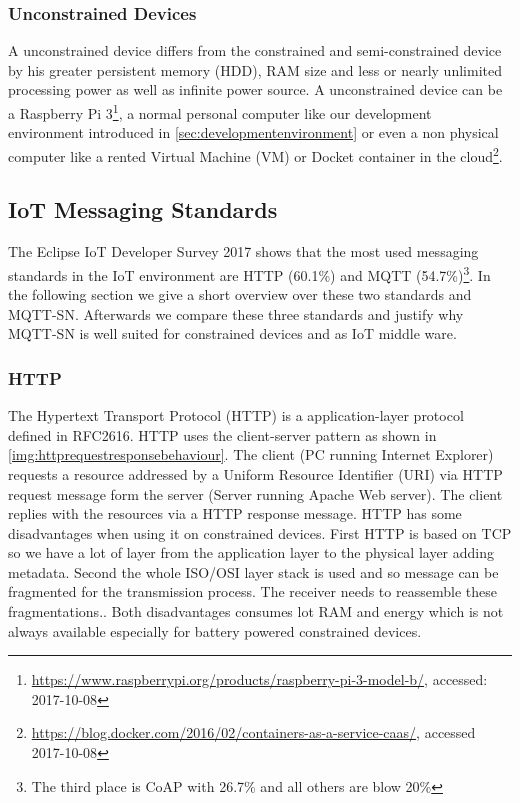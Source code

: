 \subsubsection{Unconstrained Devices}\label{sec:unconstraineddevice}
A unconstrained device differs from the constrained and semi-constrained device by his greater persistent memory (HDD), RAM size and less or nearly unlimited processing power as well as infinite power source.
A unconstrained device can be a Raspberry Pi 3\footnote{\url{https://www.raspberrypi.org/products/raspberry-pi-3-model-b/}, accessed: 2017-10-08}, a normal personal computer like our development environment introduced in \autoref{sec:developmentenvironment}  or even a non physical computer like a rented Virtual Machine (VM) or Docket container in the cloud\footnote{\url{https://blog.docker.com/2016/02/containers-as-a-service-caas/}, accessed 2017-10-08}.

\subsection{IoT Messaging Standards}\label{sec:iotmessagingstandard}
The Eclipse IoT Developer Survey 2017 shows that the most used messaging standards in the IoT environment are HTTP (60.1\%) and MQTT (54.7\%)\footnote{The third place is CoAP with 26.7\% and all others are blow 20\%\cite[p.24]{eclipseiotdevelopersurveyresults}}\cite[p.24]{eclipseiotdevelopersurveyresults}.
In the following section we give a short overview over these two standards and MQTT-SN.
Afterwards we compare these three standards and justify why MQTT-SN is well suited for constrained devices and as IoT middle ware.
\subsubsection{HTTP}
The Hypertext Transport Protocol (HTTP) is a application-layer protocol\cite[p.98]{computernetworking} defined in RFC2616\cite{RFC2616}.
HTTP uses the client-server pattern as shown in \autoref{img:httprequestresponsebehaviour}.
The client (PC running Internet Explorer) requests a resource addressed by a Uniform Resource Identifier (URI) via HTTP request message form the server (Server running Apache Web server).
The client replies with the resources via a HTTP response message.
HTTP has some disadvantages when using it on constrained devices.
First HTTP is based on TCP so we have a lot of layer from the application layer to the physical layer adding metadata. Second the whole ISO/OSI layer stack is used and so message can be fragmented for the transmission process. The receiver needs to reassemble these fragmentations.. Both disadvantages consumes lot RAM and energy which is not always available especially for battery powered constrained devices.
